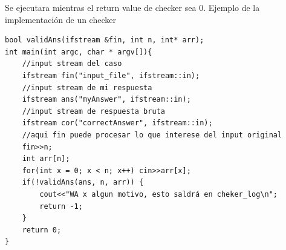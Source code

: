 Se ejecutara mientras el return value de checker sea $0$. Ejemplo de la implementación de un checker

\begin{verbatim}
bool validAns(ifstream &fin, int n, int* arr);
int main(int argc, char * argv[]){
    //input stream del caso
    ifstream fin("input_file", ifstream::in);
    //input stream de mi respuesta
    ifstream ans("myAnswer", ifstream::in);
    //input stream de respuesta bruta
    ifstream cor("correctAnswer", ifstream::in);
    //aqui fin puede procesar lo que interese del input original
    fin>>n;
    int arr[n];
    for(int x = 0; x < n; x++) cin>>arr[x];
    if(!validAns(ans, n, arr)) {
        cout<<"WA x algun motivo, esto saldrá en cheker_log\n";
        return -1;
    }
    return 0;
}
\end{verbatim}